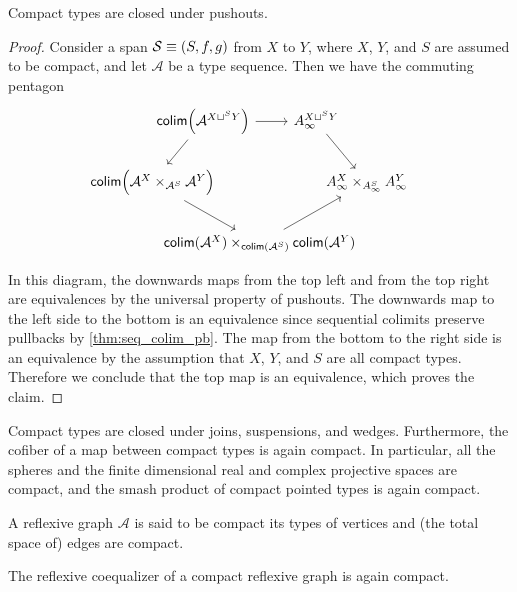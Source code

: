\begin{prp}\label{prp:pushout_compact}
Compact types are closed under pushouts.
\end{prp}

\begin{proof}
Consider a span $\mathcal{S}\equiv (S,f,g)$ from $X$ to $Y$, where $X$, $Y$, and $S$ are assumed to be compact, and let $\mathcal{A}$ be a type sequence.
Then we have the commuting pentagon
\begin{equation*}
\begin{tikzcd}[column sep=-5em]
& \mathsf{colim}\Big(\mathcal{A}^{X\sqcup^{S} Y}\Big) \arrow[rr] \arrow[dl] &[-2em] &[-2em] A_\infty^{X\sqcup^S Y} \arrow[dr] \\
\mathsf{colim}\Big(\mathcal{A}^X\times_{\mathcal{A}^S}\mathcal{A}^Y\Big) \arrow[drr] & & & & A_\infty^X \times_{A_\infty^S} A_\infty^Y \\
& & \mathsf{colim}(\mathcal{A}^X)\times_{\mathsf{colim}(\mathcal{A}^S)}\mathsf{colim}(\mathcal{A}^Y) \arrow[urr] & \phantom{\mathsf{colim}\Big(\mathcal{A}^{X\sqcup^{S} Y}\Big)} & \phantom{\mathsf{colim}\Big(\mathcal{A}^X\times_{\mathcal{A}^S}\mathcal{A}^Y\Big)}
\end{tikzcd}
\end{equation*}
In this diagram, the downwards maps from the top left and from the top right are equivalences by the universal property of pushouts. The downwards map to the left side to the bottom is an equivalence since sequential colimits preserve pullbacks by \cref{thm:seq_colim_pb}. The map from the bottom to the right side is an equivalence by the assumption that $X$, $Y$, and $S$ are all compact types. Therefore we conclude that the top map is an equivalence, which proves the claim.
\end{proof}

\begin{cor}
Compact types are closed under joins, suspensions, and wedges. Furthermore, the cofiber of a map between compact types is again compact. In particular, all the spheres and the finite dimensional real and complex projective spaces are compact, and the smash product of compact pointed types is again compact.
\end{cor}

\begin{defn}
A reflexive graph $\mathcal{A}$ is said to be compact its types of vertices and (the total space of) edges are compact.
\end{defn}

\begin{cor}
The reflexive coequalizer of a compact reflexive graph is again compact.
\end{cor}

